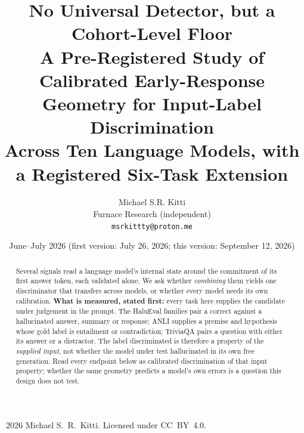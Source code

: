 \documentclass[11pt]{article}
\title{\textbf{No Universal Detector, but a Cohort-Level Floor}\\[3pt]
\large A Pre-Registered Study of Calibrated Early-Response Geometry for
Input-Label Discrimination\\
\large Across Ten Language Models, with a Registered Six-Task Extension}
\author{Michael S.R. Kitti \\ Furnace Research (independent) \\ \texttt{msrkittty@proton.me}}
\date{June--July 2026 (first version: July 26, 2026; this version: September 12, 2026)}
\begin{document}
\maketitle
\begin{center}\small\textcopyright~2026 Michael S.~R.~Kitti. Licensed under CC~BY~4.0.\end{center}

\begin{abstract}
\noindent
Several signals read a language model's internal state around the commitment of its first
answer token, each validated alone. We ask whether \emph{combining} them yields one discriminator
that transfers across models, or whether every model needs its own calibration. \textbf{What is
measured, stated first:} every task here supplies the candidate under judgement in the prompt.
The HaluEval families pair a correct against a hallucinated answer, summary or response; ANLI
supplies a premise and hypothesis whose gold label is entailment or contradiction; TriviaQA pairs a
question with either its answer or a distractor. The label discriminated is therefore a property of
the \emph{supplied input}, not whether the model under test hallucinated in its own free
generation. Read every endpoint below as calibrated discrimination of that input property; whether
the same geometry predicts a model's own errors is a question this design does not test.


\end{abstract}
\end{document}
